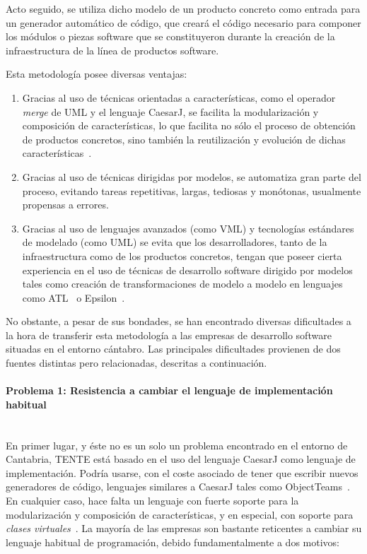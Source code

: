 Acto seguido, se utiliza dicho modelo de un producto concreto como entrada para un generador automático de código, que creará el código necesario para componer los módulos o piezas software que se constituyeron durante la creación de la infraestructura de la línea de productos software.

Esta metodología posee diversas ventajas:

\begin{enumerate}
	\item Gracias al uso de técnicas orientadas a características, como el operador \emph{merge} de UML y el lenguaje CaesarJ, se facilita la modularización y composición de características, lo que facilita no sólo el proceso de obtención de productos concretos, sino también la reutilización y evolución de dichas características~\cite{figueiredo:2008}.
	\item Gracias al uso de técnicas dirigidas por modelos, se automatiza gran parte del proceso, evitando tareas repetitivas, largas, tediosas y monótonas, usualmente propensas a errores.
	\item Gracias al uso de lenguajes avanzados (como VML) y tecnologías estándares de modelado (como UML) se evita que los desarrolladores, tanto de la infraestructura como de los productos concretos, tengan que poseer cierta experiencia en el uso de técnicas de desarrollo software dirigido por modelos tales como creación de transformaciones de modelo a modelo en lenguajes como ATL~\cite{joault:2008} o Epsilon~\cite{kolovos:2008}.
\end{enumerate}

No obstante, a pesar de sus bondades, se han encontrado diversas dificultades a la hora de transferir esta metodología a las empresas de desarrollo software situadas en el entorno cántabro. Las principales dificultades provienen de dos fuentes distintas pero relacionadas, descritas a continuación.

\paragraph{Problema 1: Resistencia a cambiar el lenguaje de implementación habitual} \ \\

En primer lugar, y éste no es un solo un problema encontrado en el entorno de Cantabria, TENTE está basado en el uso del lenguaje CaesarJ como lenguaje de implementación. Podría usarse, con el coste asociado de tener que escribir nuevos generadores de código, lenguajes similares a CaesarJ tales como ObjectTeams~\cite{herrman:2002}. En cualquier caso, hace falta un lenguaje con fuerte soporte para la modularización y composición de características, y en especial, con soporte para \emph{clases virtuales}~\cite{madsen:1989}. La mayoría de las empresas son bastante reticentes a cambiar su lenguaje habitual de programación, debido fundamentalmente a dos motivos:

